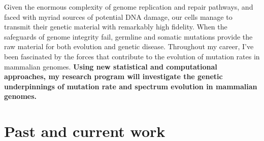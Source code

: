 \documentclass[11pt,a4paper,sans]{moderncv}
\begin{document}
\newcommand\Colorhref[3][color1]{\href{#2}{\small\color{#1}#3}}

Given the enormous complexity of genome replication and repair pathways, and 
faced with myriad sources of potential DNA damage, our cells manage to transmit 
their genetic material with remarkably high fidelity. When the safeguards of 
genome integrity fail, germline and somatic mutations provide the raw 
material for both evolution and genetic disease. Throughout my career, I've been 
fascinated by the forces that contribute to the evolution of mutation rates in 
mammalian genomes. \textbf{Using new statistical and computational approaches,  my research 
program will investigate the genetic underpinnings of mutation rate 
and spectrum evolution in mammalian genomes.}

\section{Past and current work}
\end{document}
